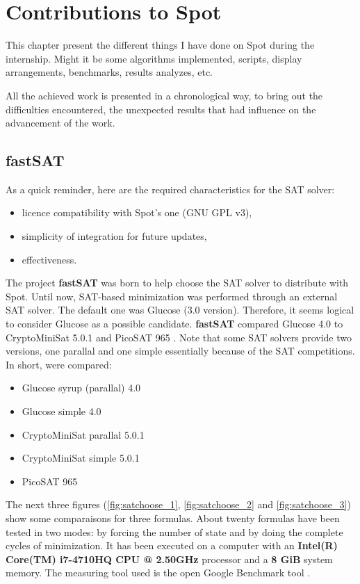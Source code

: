 \chapter{Contributions to Spot}

This chapter present the different things I have done on Spot during the internship. Might it be
some algorithms implemented, scripts, display arrangements, benchmarks, results analyzes, etc.

\noindent All the achieved work is presented in a chronological way, to bring out the difficulties
encountered, the unexpected results that had influence on the advancement of the work.

\section{fastSAT}
As a quick reminder, here are the required characteristics for the SAT solver:
\begin{itemize}
 \item licence compatibility with Spot's one (GNU GPL v3),
 \item simplicity of integration for future updates,
 \item effectiveness.
\end{itemize}

\noindent The project \textbf{fastSAT}\cite{5} was born to help choose the SAT solver to distribute with
Spot. Until now, SAT-based minimization was performed through an external SAT solver. The default one
was Glucose \cite{12} (3.0 version). Therefore, it seems logical to consider Glucose as a possible
candidate. \textbf{fastSAT}\cite{5} compared Glucose 4.0 \cite{12} to CryptoMiniSat 5.0.1\cite{20} and
PicoSAT 965 \cite{21}. Note that some SAT solvers provide two versions, one parallal and one simple
essentially because of the SAT competitions. In short, were compared:
\begin{itemize}
 \item Glucose syrup (parallal) 4.0
 \item Glucose simple 4.0
 \item CryptoMiniSat parallal 5.0.1
 \item CryptoMiniSat simple 5.0.1
 \item PicoSAT 965
\end{itemize}

The next three figures (\ref{fig:satchoose_1}, \ref{fig:satchoose_2} and \ref{fig:satchoose_3}) show some
comparaisons for three formulas. About twenty formulas have been tested in two modes: by forcing the number
of state and by doing the complete cycles of minimization. It has been executed on a computer with an
\textbf{Intel(R) Core(TM) i7-4710HQ CPU @ 2.50GHz} processor and  a \textbf{8 GiB} system memory.
The measuring tool used is the open Google Benchmark tool \cite{22}.

